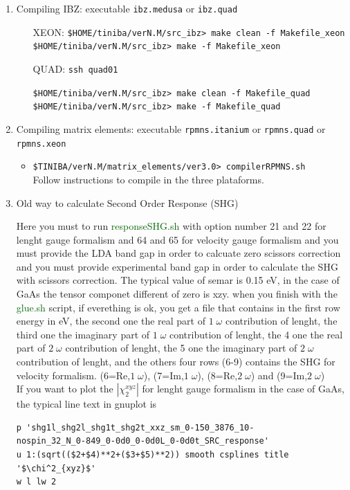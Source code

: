 \documentclass[12pt]{article}
\numberwithin{equation}{section}
\begin{document}
\begin{enumerate}
%
\item Compiling IBZ: executable \verb=ibz.medusa= or \verb=ibz.quad=
\begin{itemize}
\item[XEON:] \verb=$HOME/tiniba/verN.M/src_ibz> make clean -f Makefile_xeon= 
\verb=$HOME/tiniba/verN.M/src_ibz> make -f Makefile_xeon= 
\item[QUAD:]\verb=ssh quad01=

\verb=$HOME/tiniba/verN.M/src_ibz> make clean -f Makefile_quad= 
\verb=$HOME/tiniba/verN.M/src_ibz> make -f Makefile_quad= 
\end{itemize}
%
\item Compiling matrix elements: executable \verb=rpmns.itanium= or
  \verb=rpmns.quad= or \verb=rpmns.xeon=
\begin{itemize}
\item \verb=$TINIBA/verN.M/matrix_elements/ver3.0> compilerRPMNS.sh=\\
Follow instructions to compile in the three plataforms.
\end{itemize}
%
\item Old way to calculate Second Order Response (SHG)
 
Here you must to run \textcolor{darkgreen}{responseSHG.sh} with option number 21 and 22 for lenght
 gauge formalism and 64 and 65 for velocity gauge formalism and you must provide the LDA band gap 
 in order to calcuate zero scissors correction and you must provide experimental band gap in order to 
calculate the SHG with scissors correction. The typical value of semar is 0.15 eV, in the case of GaAs 
 the tensor componet different of zero is xzy.
when you finish with the \textcolor{darkgreen}{glue.sh} script, if everething is ok, you get  a file
that contains in the first row energy in eV,  the second one the real part of $1\;\omega$ contribution of lenght, 
the third one the imaginary part of $1\;\omega$ contribution of lenght,  
the 4 one the real part of $2\;\omega$ contribution of lenght, 
the 5 one the imaginary part of $2\;\omega$ contribution of lenght, and the others four rows (6-9)
contains the SHG for velocity formalism. (6=Re,$1\;\omega$), (7=Im,$1\;\omega$), (8=Re,$2\;\omega$) and 
(9=Im,$2\;\omega$)\\
If you want to plot the $|\chi_2^{xyz}|$ for lenght gauge formalism in the case of GaAs, the typical line text in gnuplot is 
\begin{verbatim}
p 'shg1l_shg2l_shg1t_shg2t_xxz_sm_0-150_3876_10-
nospin_32_N_0-849_0-0d0_0-0d0L_0-0d0t_SRC_response'  
u 1:(sqrt(($2+$4)**2+($3+$5)**2)) smooth csplines title '$\chi^2_{xyz}$'
w l lw 2
\end{verbatim}


\end{enumerate}
\end{document}

